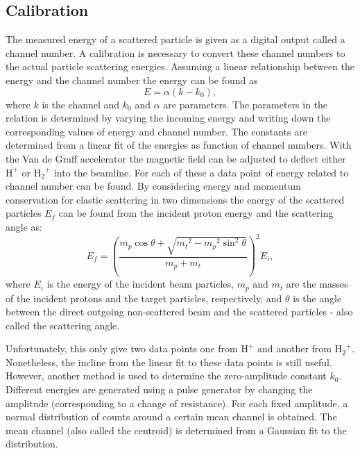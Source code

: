 \subsection{Calibration}
The measured energy of a scattered particle is given as a digital output called a channel number. A calibration is necessary to convert these channel numbers to the actual particle scattering energies. Assuming a linear relationship between the energy and the channel number the energy can be found as 
\begin{equation}
E = \alpha(k - k_0),
\end{equation}
where $k$ is the channel and $k_0$ and $\alpha$ are parameters. The parameters in the relation is determined by varying the incoming energy and writing down the corresponding values of energy and channel number. The constants are determined from a linear fit of the energies as function of channel numbers.
With the Van de Graff accelerator the magnetic field can be adjusted to deflect either $\mathrm{H^+}$ or $\mathrm{{H_2}^+}$ into the beamline. For each of these a data point of energy related to channel number can be found. 
By considering energy and momentum conservation for elastic scattering in two dimensions the energy of the scattered particles $E_f$ can be found from the incident proton energy and the scattering angle as: 
\begin{equation}
E_f = \left( \frac{m_p \cos\theta + \sqrt{{m_t}^2 - {m_p}^2 \sin^2\theta}}{m_p+m_t} \right)^2 E_i,
\end{equation}
where $E_i$ is the energy of the incident beam particles, $m_p$ and $m_t$ are the masses of the incident protons and the target particles, respectively, and $\theta$ is the angle between the direct outgoing non-scattered beam and the scattered particles - also called the scattering angle.

Unfortunately, this only give two data points one from $\mathrm{H^+}$ and
another from $\mathrm{{H_2}^+}$. Nonetheless, the incline from the linear fit to these data points is still useful. However, another method is used to determine the zero-amplitude constant $k_0$. Different energies are generated using a pulse generator by changing the amplitude (corresponding to a change of resistance). For each fixed amplitude, a normal distribution of counts around a certain mean channel is obtained. The mean channel (also called the centroid) is determined from a Gaussian fit to the distribution. 

